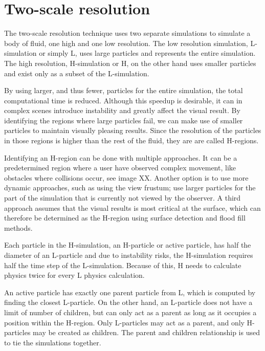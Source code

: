 \documentclass[../../main.tex]{subfiles}
\begin{document}
\tracingall

    
    
\section{Two-scale resolution}
The two-scale resolution technique uses two separate simulations to simulate a body of fluid, one high and one low resolution. The low resolution simulation, L-simulation or simply L, uses large particles and represents the entire simulation. The high resolution, H-simulation or H, on the other hand uses smaller particles and exist only as a subset of the L-simulation. 

By using larger, and thus fewer, particles for the entire simulation, the total computational time is reduced. Although this speedup is desirable, it can in complex scenes introduce instability and greatly affect the visual result. By identifying the regions where large particles fail, we can make use of smaller particles to maintain visually pleasing results. Since the resolution of the particles in those regions is higher than the rest of the fluid, they are are called H-regions.

Identifying an H-region can be done with multiple approaches. It can be a predetermined region where a user have observed complex movement, like obstacles where collisions occur, see image XX. Another option is to use more dynamic approaches, such as using the view frustum; use larger particles for the part of the simulation that is currently not viewed by the observer. A third approach assumes that the visual results is most critical at the surface, which can therefore be determined as the H-region using surface detection and flood fill methods.

Each particle in the H-simulation, an H-particle or active particle, has half the diameter of an L-particle and due to instability risks, the H-simulation requires half the time step of the L-simulation. Because of this, H needs to calculate physics twice for every L physics calculation. 

An active particle has exactly one parent particle from L, which is computed by finding the closest L-particle. On the other hand, an L-particle does not have a limit of number of children, but can only act as a parent as long as it occupies a position within the H-region. Only L-particles may act as a parent, and only H-particles may be created as children. The parent and children relationship is used to tie the simulations together. 
\end{document}
